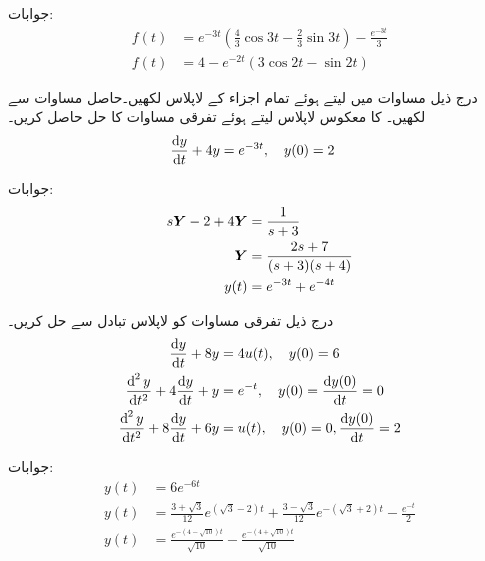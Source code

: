 جوابات:
\begin{align*}
f(t)&=e^{-3t}\left(\frac{4}{3}\cos 3t-\frac{2}{3}\sin 3t \right)-\frac{e^{-3t}}{3}\\
f(t)&=4-e^{-2t}\left(3\cos 2t-\sin 2t\right)
\end{align*}

درج ذیل مساوات میں  لیتے ہوئے تمام اجزاء کے لاپلاس لکھیں۔حاصل مساوات سے  لکھیں۔ کا معکوس لاپلاس لیتے ہوئے تفرقی مساوات کا حل  حاصل کریں۔ 
\begin{align*}
\frac{\dif y}{\dif t}+4y&=e^{-3t}, \quad y(0)=2
\end{align*}

جوابات:
\begin{align*}
s{{\boldsymbol{Y}}}-2+4{{\boldsymbol{Y}}}&=\frac{1}{s+3}\\
{{\boldsymbol{Y}}}&=\frac{2s+7}{(s+3)(s+4)}\\
y(t)&=e^{-3t}+e^{-4t}
\end{align*}

درج ذیل تفرقی مساوات کو لاپلاس تبادل سے حل کریں۔
\begin{align*}
\frac{\dif y}{\dif t}+8y&=4u(t), \quad y(0)=6\\
\frac{\dif^{\,2}y}{\dif t^2}+4 \frac{\dif y}{\dif t} +y&=e^{-t}, \quad y(0)=\frac{\dif y(0)}{\dif t}=0\\
\frac{\dif^{\,2}y}{\dif t^2}+8 \frac{\dif y}{\dif t} +6y&=u(t), \quad y(0)=0, \frac{\dif y(0)}{\dif t}=2
\end{align*}

جوابات:
\begin{align*}
y(t)&=6e^{-6t}\\
y(t)&=\frac{3+\sqrt{3}}{12}e^{(\sqrt{3}-2)t}+\frac{3-\sqrt{3}}{12}e^{-(\sqrt{3}+2)t}-\frac{e^{-t}}{2}\\
y(t)&=\frac{e^{-(4-\sqrt{10})t}}{\sqrt{10}}-\frac{e^{-(4+\sqrt{10})t}}{\sqrt{10}}
\end{align*}
